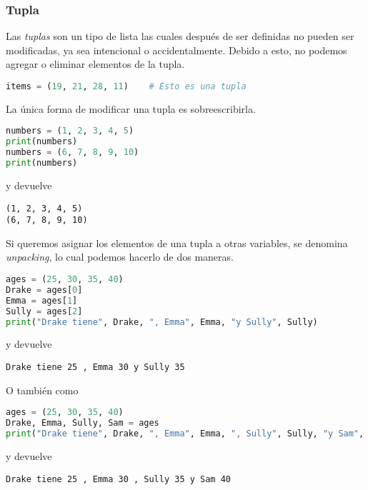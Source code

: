     \subsubsection{Tupla}\label{subsubsec: tupla}
    Las \emph{tuplas} son un tipo de lista las cuales después de ser definidas no pueden ser modificadas, ya sea intencional o accidentalmente. Debido a esto, no podemos agregar o eliminar elementos de la tupla.
    \begin{lstlisting}[language={python}]
items = (19, 21, 28, 11)    # Esto es una tupla
    \end{lstlisting}
    La única forma de modificar una tupla es sobreescribirla.
    \begin{lstlisting}[language={python}]
numbers = (1, 2, 3, 4, 5)
print(numbers)
numbers = (6, 7, 8, 9, 10)
print(numbers)
    \end{lstlisting}
    y devuelve
    \begin{lstlisting}[language={[latex]tex}]
(1, 2, 3, 4, 5)
(6, 7, 8, 9, 10)
    \end{lstlisting}
    Si queremos asignar los elementos de una tupla a otras variables, se denomina \emph{unpacking}, lo cual podemos hacerlo de dos maneras.
    \begin{lstlisting}[language={python}]
ages = (25, 30, 35, 40)
Drake = ages[0]
Emma = ages[1]
Sully = ages[2]
print("Drake tiene", Drake, ", Emma", Emma, "y Sully", Sully)
    \end{lstlisting}
    y devuelve
    \begin{lstlisting}[language={[latex]tex}]
Drake tiene 25 , Emma 30 y Sully 35
    \end{lstlisting}
    O también como
    \begin{lstlisting}[language={python}]
ages = (25, 30, 35, 40)
Drake, Emma, Sully, Sam = ages
print("Drake tiene", Drake, ", Emma", Emma, ", Sully", Sully, "y Sam", Sam)
    \end{lstlisting}
    y devuelve
    \begin{lstlisting}[language={[latex]tex}]
Drake tiene 25 , Emma 30 , Sully 35 y Sam 40
    \end{lstlisting}
